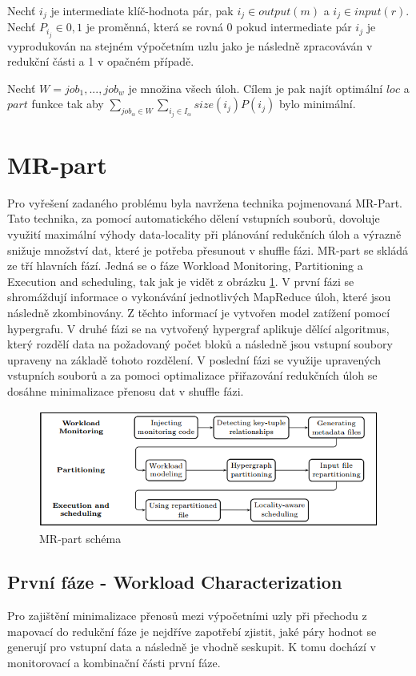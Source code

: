 \documentclass[thesis=M,czech]{FITthesis}[2012/06/26]
\begin{document}
Nechť $i_j$ je intermediate klíč-hodnota pár, pak  $i_j \in output(m)$ a $i_j \in input(r)$. Nechť $P_{i_j} \in {0,1}$ je proměnná, která se rovná 0 pokud intermediate pár $i_j$ je vyprodukován na stejném výpočetním uzlu jako je následně zpracováván v redukční části a 1 v opačném případě.  

Nechť $W = {job_1, ..., job_w}$ je množina všech úloh. Cílem je pak najít optimální $loc$ a $part$ funkce tak aby $\sum_{job_\alpha \in W} \sum_{i_j \in I_\alpha}  size(i_j)P(i_j) $ bylo minimální.

\section{MR-part}
Pro vyřešení zadaného problému byla navržena technika pojmenovaná MR-Part. Tato technika, za pomocí automatického dělení vstupních souborů, dovoluje využití maximální výhody data-locality při plánování redukčních úloh a výrazně snižuje množství dat, které je potřeba přesunout v shuffle fázi. MR-part se skládá ze tří hlavních fází. Jedná se o fáze Workload Monitoring, Partitioning a Execution and scheduling, tak jak je vidět z obrázku \ref{fig:MR-part}. V první fázi se shromáždují informace o vykonávání jednotlivých MapReduce úloh, které jsou následně zkombinovány. Z těchto informací je vytvořen model zatížení pomocí hypergrafu. V druhé fázi se na vytvořený hypergraf aplikuje dělící algoritmus, který rozdělí data na požadovaný počet bloků a následně jsou vstupní soubory upraveny na základě tohoto rozdělení. V poslední fázi se využije upravených vstupních souborů a za pomoci optimalizace přiřazování redukčních úloh se dosáhne minimalizace přenosu dat v shuffle fázi.

\begin{figure}\centering
	\includegraphics[width=1\textwidth, angle=0]{files/MR-part}
	\caption[MR-part schéma]{MR-part schéma}\label{fig:MR-part}
\end{figure}

\subsection{První fáze - Workload Characterization}
Pro zajištění minimalizace přenosů mezi výpočetními uzly při přechodu z mapovací do redukční fáze je nejdříve zapotřebí zjistit, jaké páry hodnot se generují pro vstupní data a následně je vhodně seskupit. K tomu dochází v monitorovací a kombinační části první fáze.
\end{document}
